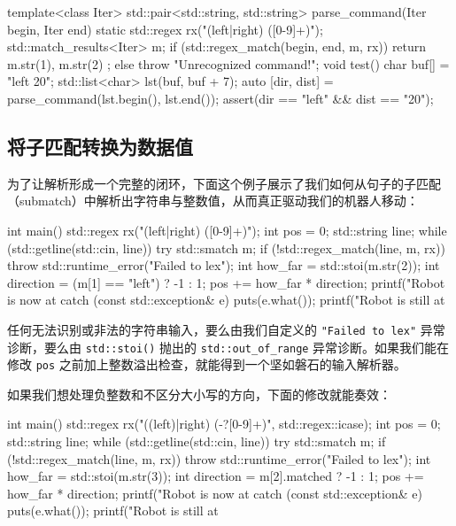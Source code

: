 \begin{codebox}[cpp]
    template<class Iter>
    std::pair<std::string, std::string>
    parse_command(Iter begin, Iter end)
    {
      static std::regex rx("(left|right) ([0-9]+)");
      std::match_results<Iter> m;
      if (std::regex_match(begin, end, m, rx)) {
        return { m.str(1), m.str(2) };
      } else {
        throw "Unrecognized command!";
      }
    }
    void test() {
      char buf[] = "left 20";
      std::list<char> lst(buf, buf + 7);
      auto [dir, dist] = parse_command(lst.begin(), lst.end());
      assert(dir == "left" && dist == "20");
    }
\end{codebox}

\subsection{将子匹配转换为数据值}

为了让解析形成一个完整的闭环，下面这个例子展示了我们如何从句子的子匹配（submatch）中解析出字符串与整数值，从而真正驱动我们的机器人移动：

\begin{codebox}[cpp]
    int main()
    {
      std::regex rx("(left|right) ([0-9]+)");
      int pos = 0;
      std::string line;
      while (std::getline(std::cin, line)) {
        try {
          std::smatch m;
          if (!std::regex_match(line, m, rx)) {
              throw std::runtime_error("Failed to lex");
          }
          int how_far = std::stoi(m.str(2));
          int direction = (m[1] == "left") ? -1 : 1;
          pos += how_far * direction;
          printf("Robot is now at %
        } catch (const std::exception& e) {
          puts(e.what());
          printf("Robot is still at %
        }
      }
    }
\end{codebox}

任何无法识别或非法的字符串输入，要么由我们自定义的 \texttt{"Failed to lex"} 异常诊断，要么由 \texttt{std::\allowbreak{}stoi(\allowbreak{})\allowbreak{}} 抛出的 \texttt{std::\allowbreak{}out\_\allowbreak{}of\_\allowbreak{}range} 异常诊断。如果我们能在修改 \texttt{pos} 之前加上整数溢出检查，就能得到一个坚如磐石的输入解析器。

如果我们想处理负整数和不区分大小写的方向，下面的修改就能奏效：

\begin{codebox}[cpp]
    int main()
    {
      std::regex rx("((left)|right) (-?[0-9]+)", std::regex::icase);
      int pos = 0;
      std::string line;
      while (std::getline(std::cin, line)) {
        try {
          std::smatch m;
          if (!std::regex_match(line, m, rx)) {
            throw std::runtime_error("Failed to lex");
          }
          int how_far = std::stoi(m.str(3));
          int direction = m[2].matched ? -1 : 1;
          pos += how_far * direction;
          printf("Robot is now at %
        } catch (const std::exception& e) {
          puts(e.what());
          printf("Robot is still at %
        }
      }
    }
\end{codebox}

